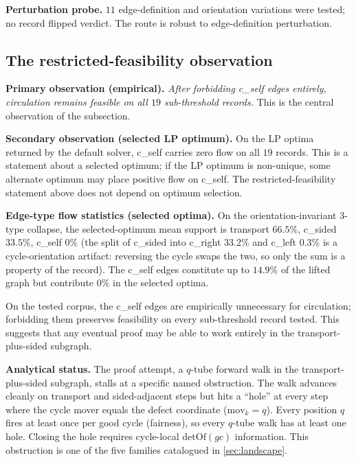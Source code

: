 \documentclass[11pt,a4paper]{article}
\theoremstyle{plain}
\theoremstyle{definition}
\newcommand{\detOf}{\mathrm{detOf}}
\begin{document}
\textbf{Perturbation probe.} $11$ edge-definition and orientation
variations were tested; no record flipped verdict.  The route is
robust to edge-definition perturbation.

\subsection{The restricted-feasibility observation}\label{sec:detector-tsided}

\textbf{Primary observation (empirical).} \emph{After forbidding c\_self
edges entirely, circulation remains feasible on all $19$ sub-threshold
records.}  This is the central observation of the subsection.

\textbf{Secondary observation (selected LP optimum).} On the LP optima
returned by the default solver, c\_self carries zero flow on all $19$
records.  This is a statement about a selected optimum; if the LP optimum
is non-unique, some alternate optimum may place positive flow on c\_self.
The restricted-feasibility statement above does not depend on optimum
selection.

\textbf{Edge-type flow statistics (selected optima).}
On the orientation-invariant 3-type collapse, the selected-optimum
mean support is transport $66.5\%$, c\_sided $33.5\%$, c\_self $0\%$
(the split of c\_sided into c\_right $33.2\%$ and c\_left $0.3\%$ is
a cycle-orientation artifact: reversing the cycle swaps the two, so
only the sum is a property of the record).  The c\_self edges
constitute up to $14.9\%$ of the lifted graph but contribute $0\%$ in
the selected optima.

On the tested corpus, the c\_self edges are empirically unnecessary for
circulation; forbidding them preserves feasibility on every sub-threshold
record tested.  This suggests that any eventual proof may be able to
work entirely in the transport-plus-sided subgraph.

\textbf{Analytical status.}  The proof attempt, a $q$-tube forward
walk in the transport-plus-sided subgraph, stalls at a specific
named obstruction.  The walk advances cleanly on transport and
sided-adjacent steps but hits a ``hole'' at every step where the cycle
mover equals the defect coordinate ($\mathrm{mov}_k = q$).  Every
position $q$ fires at least once per good cycle (fairness), so every
$q$-tube walk has at least one hole.  Closing the hole requires
cycle-local $\detOf(gc)$ information.  This obstruction is one of the
five families catalogued in \cref{sec:landscape}.
\end{document}
